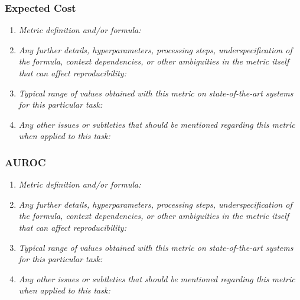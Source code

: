 \documentclass[a4paper,11pt]{article}
\begin{document}
        \subsubsection{Expected Cost}
            \begin{enumerate}[label=\alph*.]
                \item \textit{Metric definition and/or formula:}
                \bigskip
                \item \textit{Any further details, hyperparameters, processing steps, underspecification of the formula, context dependencies, or other ambiguities in the metric itself that can affect reproducibility:}
                \bigskip
                \item \textit{Typical range of values obtained with this metric on state-of-the-art systems for this particular task:}
                \bigskip
                \item \textit{Any other issues or subtleties that should be mentioned regarding this metric when applied to this task:}
                \bigskip
            \end{enumerate}
        \subsubsection{AUROC}
            \begin{enumerate}[label=\alph*.]
                \item \textit{Metric definition and/or formula:}
                \bigskip
                \item \textit{Any further details, hyperparameters, processing steps, underspecification of the formula, context dependencies, or other ambiguities in the metric itself that can affect reproducibility:}
                \bigskip
                \item \textit{Typical range of values obtained with this metric on state-of-the-art systems for this particular task:}
                \bigskip
                \item \textit{Any other issues or subtleties that should be mentioned regarding this metric when applied to this task:}
                \bigskip
            \end{enumerate}
\end{document}
